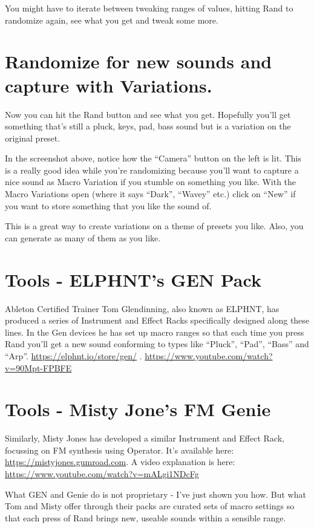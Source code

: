 \documentclass[
  12pt,
  letterpaper,
  oneside,
  open=any]{scrbook}
\begin{document}
You might have to iterate between tweaking ranges of values, hitting
Rand to randomize again, see what you get and tweak some more.

\section{Randomize for new sounds and capture with
Variations.}\label{randomize-for-new-sounds-and-capture-with-variations.}

Now you can hit the Rand button and see what you get. Hopefully you'll
get something that's still a pluck, keys, pad, bass sound but is a
variation on the original preset.

In the screenshot above, notice how the ``Camera'' button on the left is
lit. This is a really good idea while you're randomizing because you'll
want to capture a nice sound as Macro Variation if you stumble on
something you like. With the Macro Variations open (where it says
``Dark'', ``Wavey'' etc.) click on ``New'' if you want to store
something that you like the sound of.

This is a great way to create variations on a theme of presets you like.
Also, you can generate as many of them as you like.

\section{Tools - ELPHNT's GEN Pack}\label{tools---elphnts-gen-pack}

Ableton Certified Trainer Tom Glendinning, also known as ELPHNT, has
produced a series of Instrument and Effect Racks specifically designed
along these lines. In the Gen devices he has set up macro ranges so that
each time you press Rand you'll get a new sound conforming to types like
``Pluck'', ``Pad'', ``Bass'' and ``Arp''.
\url{https://elphnt.io/store/gen/} .
\url{https://www.youtube.com/watch?v=90Mpt-FPBFE}

\section{Tools - Misty Jone's FM
Genie}\label{tools---misty-jones-fm-genie}

Similarly, Misty Jones has developed a similar Instrument and Effect
Rack, focussing on FM synthesis using Operator. It's available here:
\url{https://mistyjones.gumroad.com}. A video explanation is here:
\url{https://www.youtube.com/watch?v=mALgi1NDcFg}

What GEN and Genie do is not proprietary - I've just shown you how. But
what Tom and Misty offer through their packs are curated sets of macro
settings so that each press of Rand brings new, useable sounds within a
sensible range.
\end{document}
